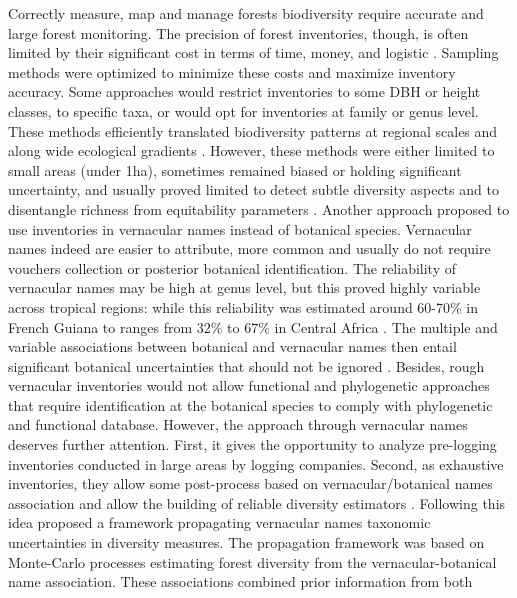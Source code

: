 \documentclass[
  11pt,
  french,
  A4paper,
  extrafontsizes,onecolumn,openright
  ]{memoir}
\begin{document}
Correctly measure, map and manage forests biodiversity require accurate
and large forest monitoring. The precision of forest inventories,
though, is often limited by their significant cost in terms of time,
money, and logistic \autocites{Feeley2011}{Baraloto2013}. Sampling
methods were optimized to minimize these costs and maximize inventory
accuracy. Some approaches would restrict inventories to some DBH or
height classes, to specific taxa, or would opt for inventories at family
or genus level. These methods efficiently translated biodiversity
patterns at regional scales and along wide ecological gradients
\autocites{Steege2000}{Higgins2004}{Rejou-Mechain2011}{Pos2014}.
However, these methods were either limited to small areas (under 1ha),
sometimes remained biased or holding significant uncertainty, and
usually proved limited to detect subtle diversity aspects and to
disentangle richness from equitability parameters
\autocites{Vellend2008}{Prance1994}. Another approach proposed to use
inventories in vernacular names instead of botanical species. Vernacular
names indeed are easier to attribute, more common and usually do not
require vouchers collection or posterior botanical identification. The
reliability of vernacular names may be high at genus level, but this
proved highly variable across tropical regions: while this reliability
was estimated around 60-70\% in French Guiana
\autocites{Hawes2012}{Guitet2014b} to ranges from 32\% to 67\% in
Central Africa \autocite{Rejou-Mechain2011}. The multiple and variable
associations between botanical and vernacular names then entail
significant botanical uncertainties that should not be ignored
\autocite{Oldeman1968}. Besides, rough vernacular inventories would not
allow functional and phylogenetic approaches that require identification
at the botanical species to comply with phylogenetic and functional
database. However, the approach through vernacular names deserves
further attention. First, it gives the opportunity to analyze
pre-logging inventories conducted in large areas by logging companies.
Second, as exhaustive inventories, they allow some post-process based on
vernacular/botanical names association and allow the building of
reliable diversity estimators
\autocites{TerSteege2006}{Feldpausch2006}{Rejou-Mechain2008}{Rejou-Mechain2011}.
Following this idea \textcite{Guitet2014b} proposed a framework
propagating vernacular names taxonomic uncertainties in diversity
measures. The propagation framework was based on Monte-Carlo processes
estimating forest diversity from the vernacular-botanical name
association. These associations combined prior information from both
\end{document}
